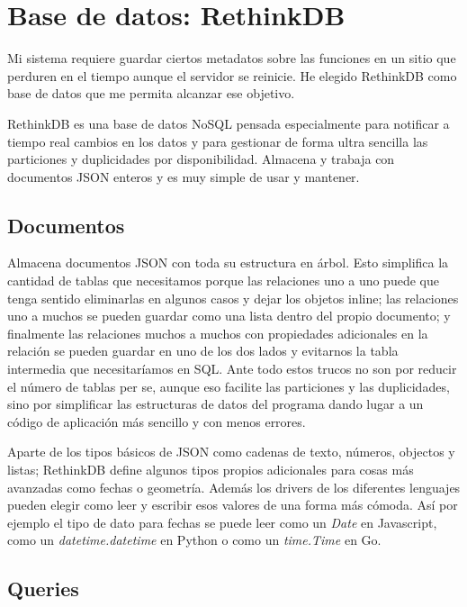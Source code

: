 \chapter{Base de datos: RethinkDB}
\label{chap:rethinkdb}

Mi sistema requiere guardar ciertos metadatos sobre las funciones en un sitio que perduren en el tiempo aunque el servidor se reinicie. He elegido RethinkDB como base de datos que me permita alcanzar ese objetivo.

RethinkDB\cite{rethinkdb} es una base de datos NoSQL pensada especialmente para notificar a tiempo real cambios en los datos y para gestionar de forma ultra sencilla las particiones y duplicidades por disponibilidad. Almacena y trabaja con documentos JSON enteros y es muy simple de usar y mantener.

\section{Documentos}

Almacena documentos JSON con toda su estructura en árbol. Esto simplifica la cantidad de tablas que necesitamos porque las relaciones uno a uno puede que tenga sentido eliminarlas en algunos casos y dejar los objetos inline; las relaciones uno a muchos se pueden guardar como una lista dentro del propio documento; y finalmente las relaciones muchos a muchos con propiedades adicionales en la relación se pueden guardar en uno de los dos lados y evitarnos la tabla intermedia que necesitaríamos en SQL. Ante todo estos trucos no son por reducir el número de tablas per se, aunque eso facilite las particiones y las duplicidades, sino por simplificar las estructuras de datos del programa dando lugar a un código de aplicación más sencillo y con menos errores.

Aparte de los tipos básicos de JSON como cadenas de texto, números, objectos y listas; RethinkDB define algunos tipos propios adicionales\cite{reqldatatypes} para cosas más avanzadas como fechas o geometría. Además los drivers de los diferentes lenguajes pueden elegir como leer y escribir esos valores de una forma más cómoda. Así por ejemplo el tipo de dato para fechas se puede leer como un \emph{Date} en Javascript, como un \emph{datetime.datetime} en Python o como un \emph{time.Time} en Go.

\section{Queries}


